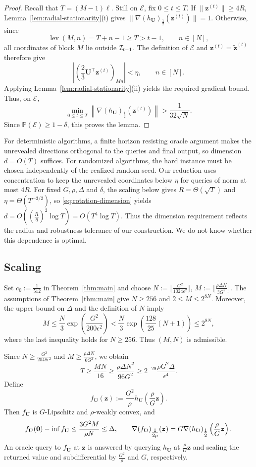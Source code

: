 \begin{proof}
Recall that $T=(M-1)\ell$.
Still on $\mathcal E$, fix $0\le t\le T$.
If $\|\bm z^{(t)}\|\ge4R$,
Lemma~\ref{lem:radial-stationarity}(i) gives
$\|\nabla(h_{\mathbf U})_{\tfrac12}(\bm z^{(t)})\|=1$.
Otherwise, since
\[
 \operatorname{lev}(M,n)=T+n-1\ge T>t-1,
 \qquad n\in[N],
\]
all coordinates of block $M$ lie outside ${\cal I}_{t-1}$.
The definition of $\mathcal E$ and
$\bm z^{(t)}=\widetilde{\bm z}^{(t)}$ therefore give
\[
 \left|
 \left(\frac23\mathbf U^\top\bm z^{(t)}\right)_{Mn}
 \right|<\eta,
 \qquad n\in[N].
\]
Applying Lemma~\ref{lem:radial-stationarity}(ii)
yields the required gradient bound.
Thus, on $\mathcal E$,
\[
 \min_{0\le t\le T}
 \left\|\nabla(h_{\mathbf U})_{\tfrac12}
                  (\bm z^{(t)})\right\|
 >\frac1{32\sqrt N}.
\]
Since $\mathbb P(\mathcal E)\ge1-\delta$,
this proves the lemma.
\end{proof}
\begin{remark}
    For deterministic algorithms, a finite horizon resisting oracle argument
\citep[Section~3.3]{carmon2020lower} makes the unrevealed
directions orthogonal to the queries and final output,
so dimension $d=O(T)$ suffices. For randomized algorithms, the hard instance must be
chosen independently of the realized random seed.
Our reduction uses concentration to keep the unrevealed
coordinates below $\eta$ for queries of norm at most $4R$. For fixed $G,\rho,\Delta$ and $\delta$, the scaling below
gives $R=\Theta(\sqrt T)$ and $\eta=\Theta(T^{-3/2})$,
so \eqref{eq:rotation-dimension} yields
$
 d=O\!\left((\tfrac{R}{\eta})^2\log T\right)
  =O(T^4\log T).
$ Thus the dimension requirement reflects the radius and
robustness tolerance of our construction.
We do not know whether this dependence is optimal. 
\end{remark}
\subsection{Scaling} 
Set $c_0:=\tfrac1{512}$ in Theorem~\ref{thm:main} and choose $ 
 N:=\lfloor\tfrac{G^2}{1024\epsilon^2}\rfloor$, $
 M:=\lfloor\tfrac{\rho\Delta N}{3G^2}\rfloor$.
The assumptions of Theorem~\ref{thm:main} give
$N\ge256$ and $2\le M\le2^{8N}$.
Moreover, the upper bound on $\Delta$ and the definition
of $N$ imply
\[
 M\le\frac N3\exp\left(\frac{G^2}{200\epsilon^2}\right)
 <\frac N3\exp\left(\frac{128}{25}(N+1)\right)
 \le2^{8N},
\]
where the last inequality holds for $N\ge256$.
Thus $(M,N)$ is admissible.

Since $N\ge \tfrac{G^2}{2048\epsilon^2}$ and
$M\ge\tfrac{\rho \Delta N}{6G^2}$, we obtain
\[
 T\ge\frac{MN}{16}
 \ge\frac{\rho\Delta N^2}{96G^2}
 \ge2^{-29}\frac{\rho G^2\Delta}{\epsilon^4}.
\]
Define
\[
 f_{\mathbf U}(\bm z)
 :=\frac{G^2}{\rho}
 h_{\mathbf U}\left(\frac\rho G\bm z\right).
\] 
Then $f_{\mathbf U}$ is $G$-Lipschitz and
$\rho$-weakly convex, and
\[
 f_{\mathbf U}({\mathbf 0})-\inf f_{\mathbf U}
 \le\frac{3G^2M}{\rho N}\le\Delta,
 \qquad
 \nabla(f_{\mathbf U})_{\tfrac1{2\rho}}(\bm z)
 =G\nabla(h_{\mathbf U})_{\tfrac12}
       \left(\frac\rho G\bm z\right).
\]
An oracle query to $f_{\mathbf U}$ at $\bm z$
is answered by querying $h_{\mathbf U}$ at
$\tfrac\rho G\bm z$ and scaling the returned
value and subdifferential by $\tfrac{G^2}{\rho}$ and $G$,
respectively. 


